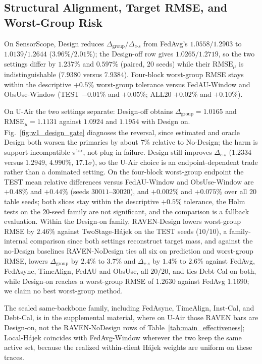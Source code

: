 \documentclass[letterpaper,journal]{IEEEtran}
\begin{document}
\subsection{Structural Alignment, Target RMSE, and Worst-Group Risk}
\label{subsec:eval_rq2}

On SensorScope, Design reduces
$\Delta_{\mathrm{group}}$/$\Delta_{c\text{-}s}$ from FedAvg's $1.0558/1.2903$ to
$1.0139/1.2644$ ($3.96\%/2.01\%$); the Design-off row gives $1.0265/1.2719$, so
the two settings differ by $1.237\%$ and $0.597\%$ (paired, 20 seeds) while
their $\mathrm{RMSE}_{\mu}$ is indistinguishable ($7.9380$ versus $7.9384$).
Four-block worst-group RMSE stays within the descriptive $+0.5\%$ worst-group
tolerance versus FedAU-Window and
ObsUse-Window (TEST $-0.01\%$ and $+0.05\%$; ALL20 $+0.02\%$ and $+0.10\%$).

On U-Air the two settings separate: Design-off obtains
$\Delta_{\mathrm{group}}=1.0165$ and $\mathrm{RMSE}_{\mu}=1.1131$ against
$1.0924$ and $1.1954$ with Design on.  Fig.~\ref{fig:w1_design_gate} diagnoses
the reversal, since estimated and oracle Design both worsen the primaries by
about $7\%$ relative to No-Design; the harm is support-incompatible
$\pi^{\mathrm{tar}}$, not plug-in failure.  Design still improves
$\Delta_{c\text{-}s}$ ($1.2334$ versus $1.2949$, $4.990\%$, $17.1\sigma$), so the
U-Air choice is an endpoint-dependent trade rather than a dominated setting.  On
the four-block worst-group endpoint the TEST mean relative differences versus
FedAU-Window and ObsUse-Window are $+0.48\%$ and $+0.44\%$ (seeds
$30011$--$30020$), and $+0.002\%$ and $+0.075\%$ over all $20$ table seeds; both
slices stay within the descriptive $+0.5\%$ tolerance, the Holm tests on the
$20$-seed family are not significant, and the comparison is a fallback
evaluation.  Within the Design-on family,
RAVEN-Design lowers worst-group RMSE by $2.46\%$ against TwoStage-H\'ajek on the
TEST seeds ($10/10$), a family-internal comparison since both settings
reconstruct target mass, and against the no-Design baselines RAVEN-NoDesign ties
all six on prediction and worst-group RMSE, lowers $\Delta_{\mathrm{group}}$ by
$2.4\%$ to $3.7\%$ and $\Delta_{c\text{-}s}$ by $1.4\%$ to $2.6\%$ against
FedAvg, FedAsync, TimeAlign, FedAU and ObsUse, all $20/20$, and ties Debt-Cal on
both, while Design-on reaches a worst-group RMSE of $1.2630$ against FedAvg
$1.1690$; we claim no best worst-group method.

The sealed same-backbone family, including FedAsync, TimeAlign, Inst-Cal, and
Debt-Cal, is in the supplemental material, where on U-Air those RAVEN bars are
Design-on, not the RAVEN-NoDesign rows of Table~\ref{tab:main_effectiveness};
Local-H\'ajek coincides with FedAvg-Window wherever the two keep the same active
set, because the realized within-client H\'ajek weights are uniform on these
traces.
\end{document}
